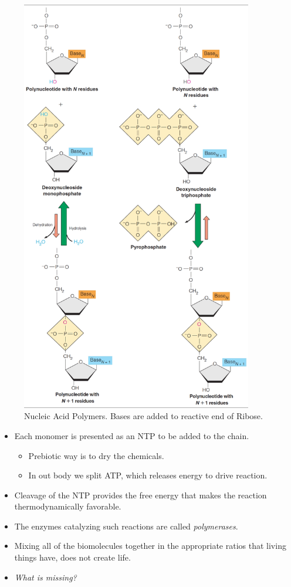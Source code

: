 \documentclass[]{article}
\begin{document}
{\begin{figure}[H]
	\caption{Nucleic Acid Polymers. Bases are added to reactive end of Ribose.}\label{fig:NucleicAcidPolymers} 
	\includegraphics[width=0.9\textwidth]{NucleicAcidPolymers}
\end{figure}

\begin{itemize}
	\item Each monomer is presented as an NTP to be added to the chain.
	\begin{itemize}
		\item Prebiotic way is to dry the chemicals.
		\item In out body we split ATP, which releases energy to drive reaction.
	\end{itemize}
	\item Cleavage of the NTP provides the free energy that makes the reaction
	thermodynamically favorable.
	\item The enzymes catalyzing such reactions are
	called 	\textit{polymerases}.
	\item Mixing all of the biomolecules together in the
	appropriate ratios that living things have, does not
	create life.
	\item \textit{What is missing?}
\end{itemize}

}
\end{document}
